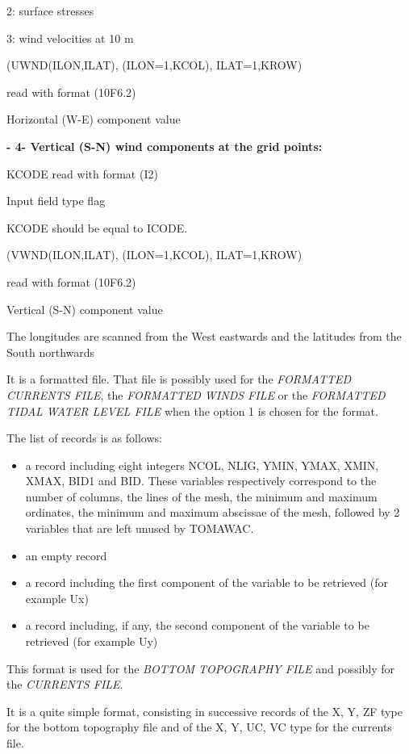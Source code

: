    2: surface stresses

   3: wind velocities at 10 m

 (UWND(ILON,ILAT), (ILON=1,KCOL), ILAT=1,KROW)

  read with format (10F6.2)

  Horizontal (W-E) component value

 \textbf{- 4- Vertical (S-N) wind components at the grid points:}

 KCODE read with format (I2)

  Input field type flag

  KCODE should be equal to ICODE.

 (VWND(ILON,ILAT), (ILON=1,KCOL), ILAT=1,KROW)

  read with format (10F6.2)

  Vertical (S-N) component value

 The longitudes are scanned from the West eastwards and the latitudes from the South northwards

 \underbar{ }\textbf{}



 It is a formatted file. That file is possibly used for the \textit{FORMATTED CURRENTS FILE}, the \textit{FORMATTED WINDS FILE} or the \textit{FORMATTED TIDAL WATER LEVEL FILE} when the option 1 is chosen for the format.

 The list of records is as follows:

\begin{itemize}
\item  a record including eight integers NCOL, NLIG, YMIN, YMAX, XMIN, XMAX, BID1 and BID. These variables respectively correspond to the number of columns, the lines of the mesh, the minimum and maximum ordinates, the minimum and maximum abscissae of the mesh, followed by 2 variables that are left unused by TOMAWAC.

\item  an empty record

\item  a record including the first component of the variable to be retrieved (for example Ux)

\item  a record including, if any, the second component of the variable to be retrieved (for example Uy)
\end{itemize}

\underbar{}

\textbf{}



 This format is used for the \textit{BOTTOM TOPOGRAPHY FILE }and possibly for the \textit{CURRENTS FILE}.

 It is a quite simple format, consisting in successive records of the X, Y, ZF type for the bottom topography file and of the X, Y, UC, VC type for the currents file.



